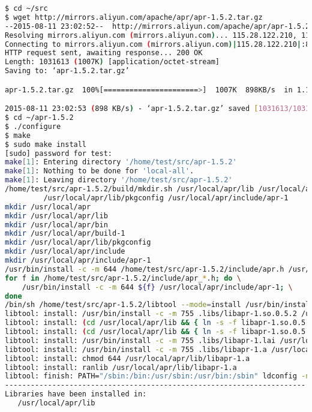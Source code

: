 \begin{lstlisting}[language=bash]
$ cd ~/src
$ wget http://mirrors.aliyun.com/apache/apr/apr-1.5.2.tar.gz
--2015-08-11 23:02:52--  http://mirrors.aliyun.com/apache/apr/apr-1.5.2.tar.gz
Resolving mirrors.aliyun.com (mirrors.aliyun.com)... 115.28.122.210, 112.124.140.210
Connecting to mirrors.aliyun.com (mirrors.aliyun.com)|115.28.122.210|:80... connected.
HTTP request sent, awaiting response... 200 OK
Length: 1031613 (1007K) [application/octet-stream]
Saving to: ‘apr-1.5.2.tar.gz’

apr-1.5.2.tar.gz  100%[======================>]  1007K  898KB/s  in 1.1s   

2015-08-11 23:02:53 (898 KB/s) - ‘apr-1.5.2.tar.gz’ saved [1031613/1031613]
$ cd ~/apr-1.5.2
$ ./configure
$ make
$ sudo make install
[sudo] password for test: 
make[1]: Entering directory '/home/test/src/apr-1.5.2'
make[1]: Nothing to be done for 'local-all'.
make[1]: Leaving directory '/home/test/src/apr-1.5.2'
/home/test/src/apr-1.5.2/build/mkdir.sh /usr/local/apr/lib /usr/local/apr/bin /usr/local/apr/build-1 \
	     /usr/local/apr/lib/pkgconfig /usr/local/apr/include/apr-1
mkdir /usr/local/apr
mkdir /usr/local/apr/lib
mkdir /usr/local/apr/bin
mkdir /usr/local/apr/build-1
mkdir /usr/local/apr/lib/pkgconfig
mkdir /usr/local/apr/include
mkdir /usr/local/apr/include/apr-1
/usr/bin/install -c -m 644 /home/test/src/apr-1.5.2/include/apr.h /usr/local/apr/include/apr-1
for f in /home/test/src/apr-1.5.2/include/apr_*.h; do \
    /usr/bin/install -c -m 644 ${f} /usr/local/apr/include/apr-1; \
done
/bin/sh /home/test/src/apr-1.5.2/libtool --mode=install /usr/bin/install -c -m 755 libapr-1.la /usr/local/apr/lib
libtool: install: /usr/bin/install -c -m 755 .libs/libapr-1.so.0.5.2 /usr/local/apr/lib/libapr-1.so.0.5.2
libtool: install: (cd /usr/local/apr/lib && { ln -s -f libapr-1.so.0.5.2 libapr-1.so.0 || { rm -f libapr-1.so.0 && ln -s libapr-1.so.0.5.2 libapr-1.so.0; }; })
libtool: install: (cd /usr/local/apr/lib && { ln -s -f libapr-1.so.0.5.2 libapr-1.so || { rm -f libapr-1.so && ln -s libapr-1.so.0.5.2 libapr-1.so; }; })
libtool: install: /usr/bin/install -c -m 755 .libs/libapr-1.lai /usr/local/apr/lib/libapr-1.la
libtool: install: /usr/bin/install -c -m 755 .libs/libapr-1.a /usr/local/apr/lib/libapr-1.a
libtool: install: chmod 644 /usr/local/apr/lib/libapr-1.a
libtool: install: ranlib /usr/local/apr/lib/libapr-1.a
libtool: finish: PATH="/sbin:/bin:/usr/sbin:/usr/bin:/sbin" ldconfig -n /usr/local/apr/lib
----------------------------------------------------------------------
Libraries have been installed in:
   /usr/local/apr/lib


\end{lstlisting}
